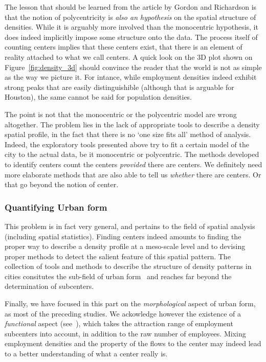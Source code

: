 The lesson that should be learned from the article by Gordon and Richardson is
that the notion of polycentricity is \emph{also an hypothesis} on the spatial
structure of densities. While it is arguably more involved than the monocentric
hypothesis, it does indeed implicitly impose some structure onto the data. The
process itself of counting centers implies that these centers exist, that there
is an element of reality attached to what we call centers. A quick look on the
3D plot shown on Figure~\ref{fig:density_3d} should convince the reader that the world
is not as simple as the way we picture it. For intance, while employment
densities indeed exhibit strong peaks that are easily distinguishible (although
that is arguable for Houston), the same cannot be said for population densities.

The point is not that the monocentric or the polycentric model are wrong
altogether. The problem lies in the lack of appropriate tools to describe a
density spatial profile, in the fact that there is no `one size fits all' method
of analysis. Indeed, the exploratory tools presented above try to fit a certain
model of the city to the actual data, be it monocentric or polycentric. The
methods developed to identify centers count the centers \emph{provided} there
are centers. We definitely need more elaborate methods that are also able to
tell us \emph{whether} there are centers. Or that go beyond the notion of
center.

\subsubsection{Quantifying Urban form}
\label{sub:urban_form}

This problem is in fact very general, and pertains to the field of spatial
analysis (including spatial statistics). Finding centers indeed amounts to
finding the proper way to describe a density profile at a meso-scale level and
to devising proper methods to detect the salient feature of this spatial
pattern. The collection of tools and methods to describe the structure
of density patterns in cities consitutes the sub-field of urban
form~\cite{Tsai:2005,Schwarz:2010,LeNechet:2010_these,LeNechet:2015} and reaches far beyond the
determination of subcenters.

Finally, we have focused in this part on the \emph{morphological} aspect of urban form,
as most of the preceding studies. We ackowledge however the existence of a
\emph{functional} aspect (see~\cite{Berroir:2008}), which takes the attraction
range of employment subcenters into account, in addition to the raw number of
employees. Mixing employment densities and the property of the flows to the
center may indeed lead to a better understanding of what a center really is.

